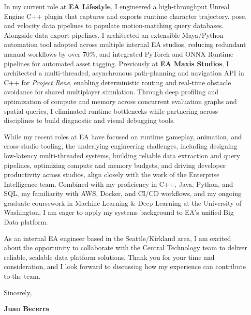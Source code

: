 \documentclass[letterpaper,11pt]{article}
\begin{document}
In my current role at \textbf{EA Lifestyle}, I engineered a high-throughput Unreal Engine C++ 
plugin that captures and exports runtime character trajectory, pose, and velocity data pipelines 
to populate motion-matching query databases. Alongside data export pipelines, I architected an 
extensible Maya/Python automation tool adopted across multiple internal EA studios, reducing 
redundant manual workflows by over 70\%, and integrated PyTorch and ONNX Runtime pipelines for 
automated asset tagging. Previously at \textbf{EA Maxis Studios}, I architected a multi-threaded, 
asynchronous path-planning and navigation API in C++ for \emph{Project Rene}, enabling 
deterministic routing and real-time obstacle avoidance for shared multiplayer simulation. Through 
deep profiling and optimization of compute and memory across concurrent evaluation graphs and 
spatial queries, I eliminated runtime bottlenecks while partnering across disciplines to build 
diagnostic and visual debugging tools.

While my recent roles at EA have focused on runtime gameplay, animation, and cross-studio 
tooling, the underlying engineering challenges, including designing low-latency multi-threaded 
systems, building reliable data extraction and query pipelines, optimizing compute and memory 
budgets, and driving developer productivity across studios, align closely with the work of the 
Enterprise Intelligence team. Combined with my proficiency in C++, Java, Python, and SQL, my 
familiarity with AWS, Docker, and CI/CD workflows, and my ongoing graduate coursework in Machine 
Learning \& Deep Learning at the University of Washington, I am eager to apply my systems 
background to EA's unified Big Data platform.

As an internal EA engineer based in the Seattle/Kirkland area, I am excited about the opportunity 
to collaborate with the Central Technology team to deliver reliable, scalable data platform 
solutions. Thank you for your time and consideration, and I look forward to discussing how my 
experience can contribute to the team.

\vspace{10pt}
\noindent Sincerely,

\vspace{14pt}
\noindent \textbf{Juan Becerra}
\end{document}
